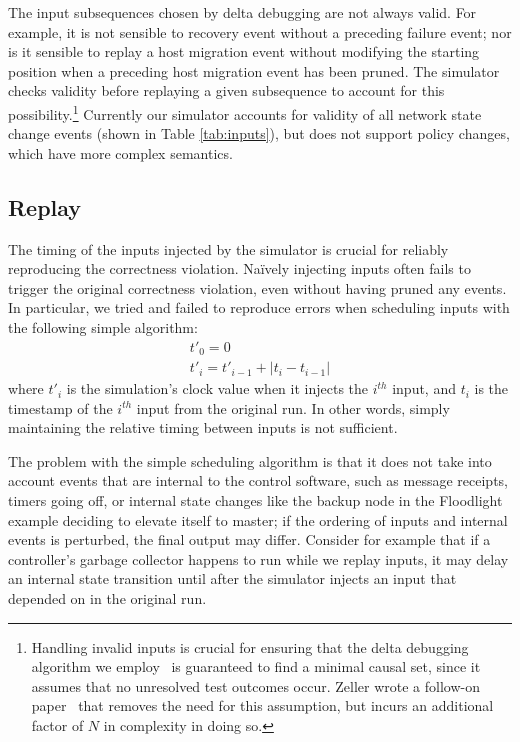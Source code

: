 The input subsequences chosen by delta debugging are not always valid. For
example, it is not sensible to recovery event without a
preceding failure event; nor is it sensible to replay a host migration
event without modifying the starting position when a preceding host
migration event has been pruned. The simulator checks
validity before replaying a given subsequence to account for this
possibility.\footnote{Handling invalid inputs is crucial for
ensuring that the delta debugging algorithm we employ~\cite{Zeller:1999:YMP:318773.318946}
is guaranteed to find a minimal causal set, since it assumes that no unresolved
test outcomes occur. Zeller wrote a follow-on
paper~\cite{Zeller:2002:SIF:506201.506206} that removes the need for this assumption,
but incurs an additional factor of $N$ in complexity in doing so.}
Currently our simulator accounts for validity of all network state change
events (shown in Table \ref{tab:inputs}), but does not support policy changes,
which have more complex semantics.

\subsection{Replay}
\label{subsec:replay}

The timing of the inputs injected by the simulator is crucial for reliably
reproducing the
correctness violation. Na\"ively injecting inputs often fails to
trigger the original correctness violation, even without having pruned any
events. In particular, we tried and failed to reproduce errors when scheduling inputs
with the following simple algorithm:
\begin{align*}
t'_0 = 0 \\
t'_i = t'_{i-1} + |t_{i} - t_{i-1}|
\end{align*}
where $t'_i$ is the simulation's clock value when it injects the $i^{th}$ input, and $t_i$ is
the timestamp of the $i^{th}$ input from the original run. In other words, simply
maintaining the relative timing between inputs is not sufficient.

The problem with the simple scheduling algorithm is that it does not take into
account events that are internal to the control software, such as
message receipts, timers going off, or internal state
changes like the backup node in the Floodlight example deciding to elevate
itself to master; if the ordering of inputs and internal events is
perturbed, the final output may differ.
Consider for example that if a controller's garbage collector happens to run
while we replay inputs, it may delay an internal state transition until
after the simulator injects an input that depended on in the original run.

